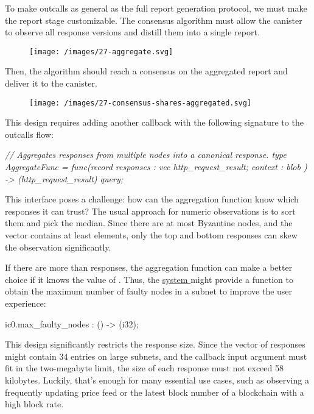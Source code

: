 \documentclass{article}
\begin{document}
To make  outcalls as general as the full report generation protocol, we must make the report stage customizable.
The  consensus algorithm must allow the canister to observe all response versions and distill them into a single report.

\begin{figure}[grayscale-diagram,medium-size]
\texttt{[image: /images/27-aggregate.svg]}
\end{figure}

Then, the algorithm should reach a consensus on the aggregated report and deliver it to the canister.

\begin{figure}[grayscale-diagram,medium-size]
\texttt{[image: /images/27-consensus-shares-aggregated.svg]}
\end{figure}

This design requires adding another callback with the following signature to the  outcalls flow:

\label{aggregate-func}
\begin{code}[candid]
\em{// Aggregates responses from multiple nodes into a canonical response.}
type AggregateFunc = func(record {
    responses : vec http_request_result;
    context : blob
}) -> (http_request_result) query;
\end{code}

This interface poses a challenge: how can the aggregation function know which responses it can trust?
The usual approach for numeric observations is to sort them and pick the median. 
Since there are at most  Byzantine nodes, and the  vector contains at least  elements, only the top and bottom  responses can skew the observation significantly.

If there are more than  responses, the aggregation function can make a better choice if it knows the value of .
Thus, the \href{https://internetcomputer.org/docs/current/references/ic-interface-spec/#system-api}{system } might provide a function to obtain the maximum number of faulty nodes in a subnet to improve the user experience:

\begin{code}
ic0.max_faulty_nodes : () -> (i32);
\end{code}

This design significantly restricts the  response size.
Since the vector of responses might contain 34 entries on large subnets, and the callback input argument must fit in the two-megabyte limit, the size of each response must not exceed 58 kilobytes.
Luckily, that’s enough for many essential use cases, such as observing a frequently updating price feed or the latest block number of a blockchain with a high block rate.
\end{document}
